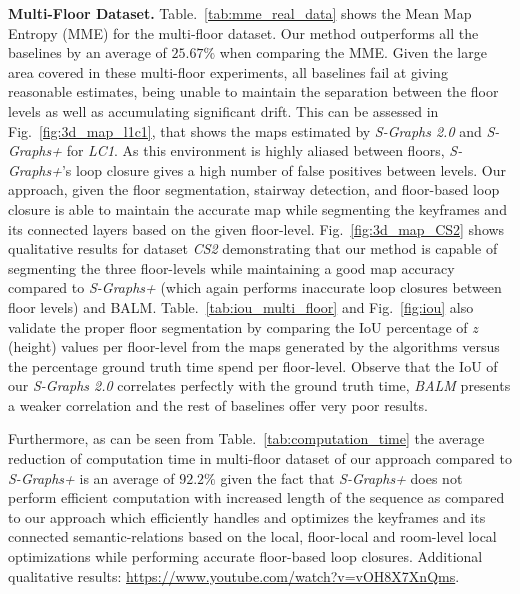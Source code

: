 \textbf{Multi-Floor Dataset.}
Table.~\ref{tab:mme_real_data} shows the Mean Map Entropy (MME) for the multi-floor dataset. Our method outperforms all the baselines by an average of $25.67\%$ when comparing the MME. Given the large area covered in these multi-floor experiments, all baselines fail at giving reasonable estimates, being unable to maintain the separation between the floor levels as well as accumulating significant drift. This can be assessed in  Fig.~\ref{fig:3d_map_l1c1}, that shows the maps estimated by \textit{S-Graphs 2.0} and \textit{S-Graphs+} for \textit{LC1}. As this environment is highly aliased between floors, \textit{S-Graphs+}'s loop closure gives a high number of false positives between levels. Our approach, given the floor segmentation, stairway detection, and floor-based loop closure is able to maintain the accurate map while segmenting the keyframes and its connected layers based on the given floor-level. Fig.~\ref{fig:3d_map_CS2} shows qualitative results for dataset \textit{CS2} demonstrating that our method is capable of segmenting the three floor-levels while maintaining a good map accuracy compared to \textit{S-Graphs+} (which again performs inaccurate loop closures between floor levels) and BALM. Table.~\ref{tab:iou_multi_floor} and Fig.~\ref{fig:iou} also validate the proper floor segmentation by comparing the IoU percentage of $z$ (height) values per floor-level from the maps generated by the algorithms versus the percentage ground truth time spend per floor-level. Observe that the IoU of our \textit{S-Graphs 2.0} correlates perfectly with the ground truth time, \textit{BALM} presents a weaker correlation and the rest of baselines offer very poor results.  

Furthermore, as can be seen from Table.~\ref{tab:computation_time} the average reduction of computation time in multi-floor dataset of our approach compared to \textit{S-Graphs+} is an average of $92.2\%$ given the fact that \textit{S-Graphs+} does not perform efficient computation with increased length of the sequence as compared to our approach which efficiently handles and optimizes the keyframes and its connected semantic-relations based on the local, floor-local and room-level local optimizations while performing accurate floor-based loop closures. Additional qualitative results: \url{https://www.youtube.com/watch?v=vOH8X7XnQms}. 

